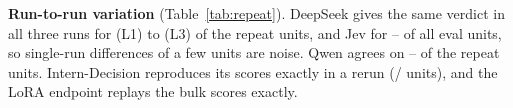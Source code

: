

\textbf{Run-to-run variation} (Table~\ref{tab:repeat}).
DeepSeek gives the same verdict in all three runs for  (L1) to  (L3) of the repeat units,
and Jev for -- of all eval units,
so single-run differences of a few units are noise.
Qwen agrees on -- of the repeat units.
Intern-Decision reproduces its scores exactly in a rerun (/ units),
and the LoRA endpoint replays the bulk scores exactly.
